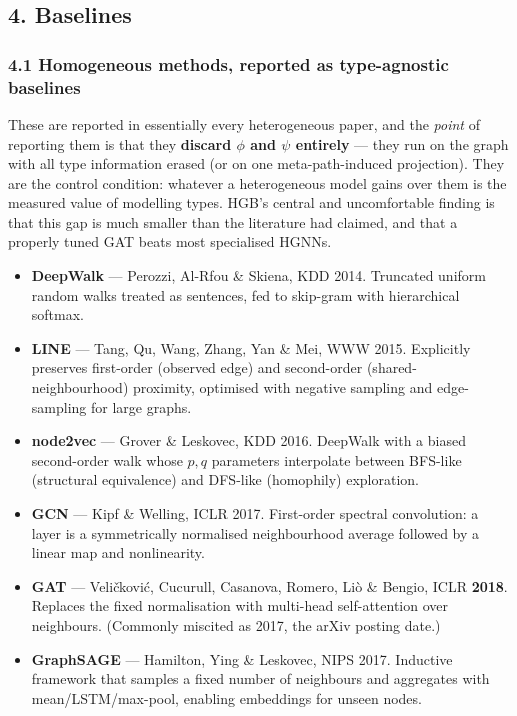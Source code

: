 \newcommand{\pTwoTgt}{orange!22}
\newcommand{\pTwoAgt}{blue!12}
\newcommand{\pTwoAtt}{green!14}
\newcommand{\pTwoVen}{purple!12}

\subsection*{4. Baselines}
\label{p2:sec:baselines}

\subsubsection*{4.1 Homogeneous methods, reported as type-agnostic baselines}

These are reported in essentially every heterogeneous paper, and the \emph{point} of reporting
them is that they \textbf{discard $\phi$ and $\psi$ entirely} --- they run on the graph with all
type information erased (or on one meta-path-induced projection). They are the control condition:
whatever a heterogeneous model gains over them is the measured value of modelling types. HGB's
central and uncomfortable finding is that this gap is much smaller than the literature had
claimed, and that a properly tuned GAT beats most specialised HGNNs.

\begin{itemize}\itemsep2pt
\item \textbf{DeepWalk} --- Perozzi, Al-Rfou \& Skiena, KDD 2014. Truncated uniform random walks
  treated as sentences, fed to skip-gram with hierarchical softmax.
\item \textbf{LINE} --- Tang, Qu, Wang, Zhang, Yan \& Mei, WWW 2015. Explicitly preserves
  first-order (observed edge) and second-order (shared-neighbourhood) proximity, optimised with
  negative sampling and edge-sampling for large graphs.
\item \textbf{node2vec} --- Grover \& Leskovec, KDD 2016. DeepWalk with a biased second-order walk
  whose $p,q$ parameters interpolate between BFS-like (structural equivalence) and DFS-like
  (homophily) exploration.
\item \textbf{GCN} --- Kipf \& Welling, ICLR 2017. First-order spectral convolution: a layer is a
  symmetrically normalised neighbourhood average followed by a linear map and nonlinearity.
\item \textbf{GAT} --- Veli\v{c}kovi\'{c}, Cucurull, Casanova, Romero, Li\`{o} \& Bengio, ICLR
  \textbf{2018}. Replaces the fixed normalisation with multi-head self-attention over neighbours.
  (Commonly miscited as 2017, the arXiv posting date.)
\item \textbf{GraphSAGE} --- Hamilton, Ying \& Leskovec, NIPS 2017. Inductive framework that
  samples a fixed number of neighbours and aggregates with mean/LSTM/max-pool, enabling embeddings
  for unseen nodes.
\end{itemize}

